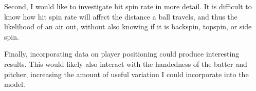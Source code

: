 Second, I would like to investigate hit spin rate in more detail. It is difficult to know how hit spin rate will affect the distance a ball travels, and thus the likelihood of an air out, without also knowing if it is backspin, topspin, or side spin.

Finally, incorporating data on player positioning could produce interesting results. This would likely also interact with the handedness of the batter and pitcher, increasing the amount of useful variation I could incorporate into the model.